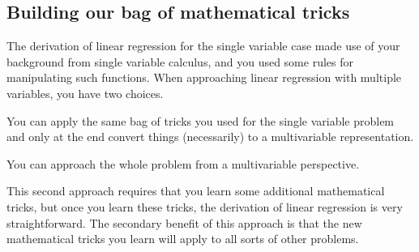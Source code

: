 \documentclass[assignment02_Solutions]{subfiles}
\begin{document}
\subsection{Building our bag of mathematical tricks}

The derivation of linear regression for the single variable case made use of your background from single variable calculus, and you used some rules for manipulating such functions.  When approaching linear regression with multiple variables, you have two choices.
\be
\item You can apply the same bag of tricks you used for the single variable problem and only at the end convert things (necessarily) to a multivariable representation.  
\item You can approach the whole problem from a multivariable perspective.
\ee

This second approach requires that you learn some additional mathematical tricks, but once you learn these tricks, the derivation of linear regression is very straightforward.  The secondary benefit of this approach is that the new mathematical tricks you learn will apply to all sorts of other problems.
\end{document}
